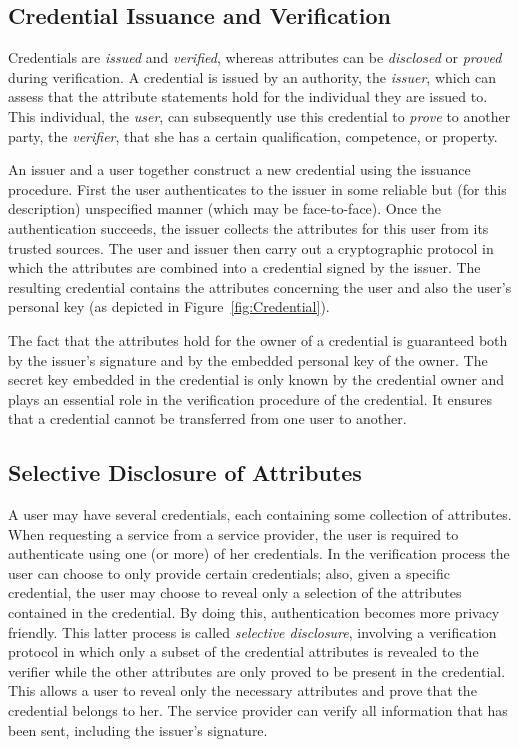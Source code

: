 \subsection{Credential Issuance and Verification}

Credentials are \emph{issued} and \emph{verified}, whereas attributes can be
\emph{disclosed} or \emph{proved} during verification. A credential is issued
by an authority, the \emph{issuer}, which can assess that the
attribute statements hold for the individual they are issued to. This
individual, the \emph{user}, can subsequently use this credential to
\emph{prove} to another party, the \emph{verifier}, that she
has a certain qualification, competence, or property.

An issuer and a user together construct a new credential using the issuance
procedure. First the user authenticates to the issuer
in some reliable but (for this description) unspecified manner (which may be
face-to-face). Once the authentication succeeds, the issuer collects the
attributes for this user from its trusted sources. The user and issuer then
carry out a cryptographic protocol in which the attributes are combined into a
credential signed by the issuer. The resulting credential contains the
attributes concerning the user and also the user's personal key (as depicted in
Figure~\ref{fig:Credential}).

The fact that the attributes hold for the owner of a credential is guaranteed
both by the issuer's signature and by the embedded personal key of the owner.
The secret key embedded in the credential is only known by the credential owner
and plays an essential role in the verification procedure of the credential. It ensures that a credential cannot be transferred
from one user to another.

\subsection{Selective Disclosure of Attributes}

A user may have several credentials, each containing some collection of
attributes. When requesting a service from a service provider, the user is
required to authenticate using one (or more) of her credentials. In the
verification process the user can choose to only provide certain credentials;
also, given a specific credential, the user may choose to reveal only a
selection of the attributes contained in the credential. By
doing this, authentication becomes more privacy friendly. This latter process is
called \emph{selective disclosure}, involving
a verification protocol in which only a subset of the credential attributes is
revealed to the verifier while the other attributes are only proved to be
present in the credential. This allows a user to reveal only the necessary
attributes and prove that the credential belongs to her. The service provider
can verify all information that has been sent, including the issuer's signature.

